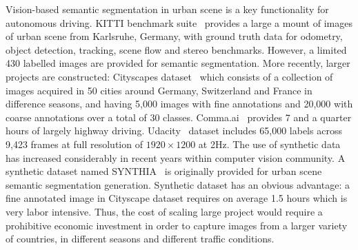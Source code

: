 \documentclass[10pt,twocolumn,letterpaper]{article}
\begin{document}
Vision-based semantic segmentation in urban scene is a key functionality for autonomous driving.
KITTI benchmark suite~\cite{Geiger2013IJRR} provides a large a mount of images of urban scene from Karlsruhe, Germany, with ground truth data for odometry, object detection, tracking, scene flow and stereo benchmarks. However, a limited 430 labelled images are provided for semantic segmentation.
More recently, larger projects are constructed:
Cityscapes dataset~\cite{Cordts2016Cityscapes} which consists of a collection of images acquired in 50 cities around Germany, Switzerland and France in difference seasons, and having 5,000 images with fine annotations and 20,000 with coarse annotations over a total of 30 classes. Comma.ai~\cite{santana2016learning} provides 7 and a quarter hours of largely highway driving. Udacity~\cite{udacity} dataset includes 65,000 labels across 9,423 frames at full resolution of $1920\times1200$ at 2Hz.
The use of synthetic data has increased considerably in recent years within computer vision community. A synthetic dataset named SYNTHIA~\cite{mueller2016benchmark} is originally provided for urban scene semantic segmentation generation.
Synthetic dataset has an obvious advantage: a fine annotated image in Cityscape dataset requires on average 1.5 hours which is very labor intensive. Thus, the cost of scaling large project would require a prohibitive economic investment in order to capture images from a larger variety of countries, in different seasons and different traffic conditions.
\end{document}
